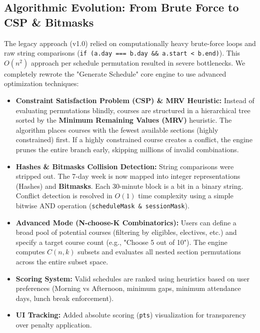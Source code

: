 \documentclass[12pt,a4paper]{article}
\begin{document}
\subsection{Algorithmic Evolution: From Brute Force to CSP \& Bitmasks}
The legacy approach (v1.0) relied on computationally heavy brute-force loops and raw string comparisons (\texttt{if (a.day === b.day \&\& a.start < b.end)}). This $O(n^2)$ approach per schedule permutation resulted in severe bottlenecks.
We completely rewrote the "Generate Schedule" core engine to use advanced optimization techniques:
\begin{itemize}[label=\textcolor{blue}{\textbullet}]
    \item \textbf{Constraint Satisfaction Problem (CSP) \& MRV Heuristic:} Instead of evaluating permutations blindly, courses are structured in a hierarchical tree sorted by the \textbf{Minimum Remaining Values (MRV)} heuristic. The algorithm places courses with the fewest available sections (highly constrained) first. If a highly constrained course creates a conflict, the engine prunes the entire branch early, skipping millions of invalid combinations.
    \item \textbf{Hashes \& Bitmasks Collision Detection:} String comparisons were stripped out. The 7-day week is now mapped into integer representations (Hashes) and \textbf{Bitmasks}. Each 30-minute block is a bit in a binary string. Conflict detection is resolved in $O(1)$ time complexity using a simple bitwise AND operation (\texttt{scheduleMask \& sessionMask}).
    \item \textbf{Advanced Mode (N-choose-K Combinatorics):} Users can define a broad pool of potential courses (filtering by eligibles, electives, etc.) and specify a target course count (e.g., "Choose 5 out of 10"). The engine computes $C(n, k)$ subsets and evaluates all nested section permutations across the entire subset space.
    \item \textbf{Scoring System:} Valid schedules are ranked using heuristics based on user preferences (Morning vs Afternoon, minimum gaps, minimum attendance days, lunch break enforcement).
    \item \textbf{UI Tracking:} Added absolute scoring (\texttt{pts}) visualization for transparency over penalty application.
\end{itemize}
\end{document}
